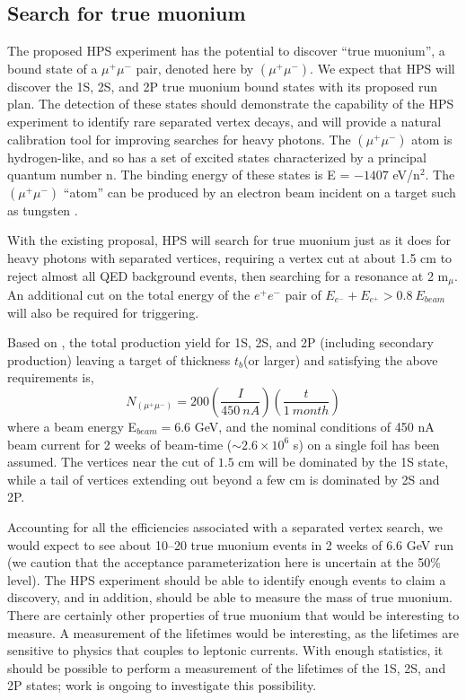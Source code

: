\subsection{Search for true muonium}

The proposed HPS experiment has the potential to discover ``true muonium'', a bound state of a
$\mu^+ \mu^-$ pair, denoted here by $(\mu^+ \mu^-)$. 
We expect that HPS will discover the 1S, 2S, and 2P true muonium bound states with its proposed run plan. 
The detection of these states should demonstrate the capability of the HPS experiment 
to identify rare separated vertex decays, and will provide a natural calibration 
tool for improving searches for heavy photons.
The $(\mu^+ \mu^-)$ atom is hydrogen-like, and so has a set of excited states characterized by a principal quantum number n. 
The binding energy of these states is E = $-1407$ eV/n$^2$. The $(\mu^+ \mu^-)$ ``atom'' can be produced by an electron beam incident on a target such 
as tungsten \cite{Holvik:1986ty,ArteagaRomero:2000yh}. 

With the existing proposal, HPS will search for true muonium
just as it does for heavy photons with separated vertices, requiring a vertex cut at about 1.5 cm to reject almost all
QED background events, then searching for a resonance at 2 m$_{\mu}$. An additional cut 
on the total energy of the $e^+e^-$ pair of $E_{e^-}+E_{e^+}> 0.8 \ E_{beam}$ will also be required
for triggering. 

Based on \cite{Banburski:2012tk}, the total production yield for 1S, 2S, and 2P (including secondary production)
leaving a target of thickness $t_b$(or larger) and satisfying the above requirements is,
\begin{equation}
N_{(\mu^+ \mu^-)} = 200 \left( \frac{I}{450 \ nA} \right) \left( \frac{t}{1 \ month} \right)
\end{equation}
%
where a beam energy E$_{beam} = 6.6$ GeV, and the nominal conditions
of 450 nA beam current for 2 weeks of beam-time ($\sim 2.6 \times 10^6$ s) on a single foil has been assumed.
The vertices near the cut of $1.5$ cm will be dominated by the 1S state, while 
a tail of vertices extending out beyond a few cm is dominated by 2S and 2P. 

Accounting for all the efficiencies associated with a separated vertex search, we would expect to see about 10--20 true muonium events in 2 weeks of $6.6$ GeV run
(we caution that the acceptance parameterization here is uncertain at the 50\% level).
The HPS experiment should be able to identify enough events to claim a discovery, and in addition, should be able to measure the mass of true muonium.  There are certainly other properties of true muonium that would be interesting to measure.  A measurement of the lifetimes would be interesting, as the lifetimes are sensitive to physics that couples to leptonic currents.  With enough statistics, it should be possible to perform a measurement of the lifetimes of the 1S, 2S, and 2P states; work is ongoing to investigate this possibility.  


